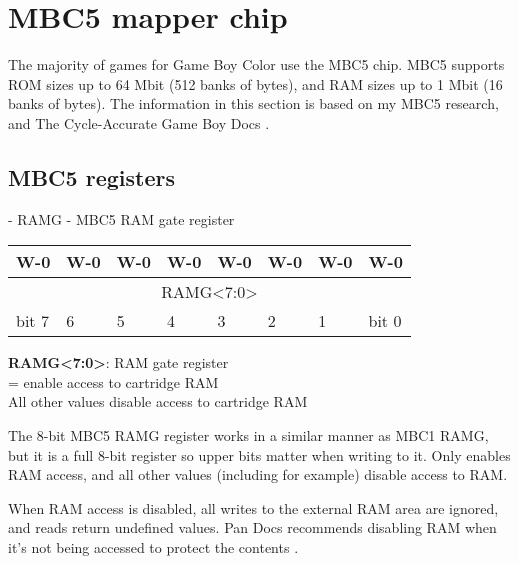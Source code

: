 \documentclass[\main/gbctr.tex]{subfiles}
\begin{document}
\chapter{MBC5 mapper chip}

The majority of games for Game Boy Color use the MBC5 chip. MBC5 supports ROM
sizes up to 64 Mbit (512 banks of  bytes), and RAM sizes up to 1 Mbit
(16 banks of  bytes). The information in this section is based on my
MBC5 research, and The Cycle-Accurate Game Boy Docs \cite{tcagbd}.

\section{MBC5 registers}

\begin{register}[H]
  \caption{ - RAMG - MBC5 RAM gate register}
  {
    \ttfamily
    \begin{tabularx}{\linewidth}{|X|X|X|X|X|X|X|X|}
      \hline
      W-0 & W-0 & W-0 & W-0 & W-0 & W-0 & W-0 & W-0 \\
      \hline
      \multicolumn{8}{|c|}{RAMG<7:0>} \\
      \hline
      bit 7 & 6 & 5 & 4 & 3 & 2 & 1 & bit 0 \\
      \hline
    \end{tabularx}{\parfillskip=0pt\par}
  }

  \begin{description}[leftmargin=5em, style=nextline]
    \item[bit 7-0]
      \textbf{RAMG<7:0>}: RAM gate register\\
      = enable access to cartridge RAM\\
      All other values disable access to cartridge RAM
  \end{description}
\end{register}

The 8-bit MBC5 RAMG register works in a similar manner as MBC1 RAMG, but it is
a full 8-bit register so upper bits matter when writing to it. Only
 enables RAM access, and all other values (including
 for example) disable access to RAM.

When RAM access is disabled, all writes to the external RAM area
 are ignored, and reads return undefined values. Pan Docs
recommends disabling RAM when it's not being accessed to protect the contents
\cite{pandocs}.
\end{document}
